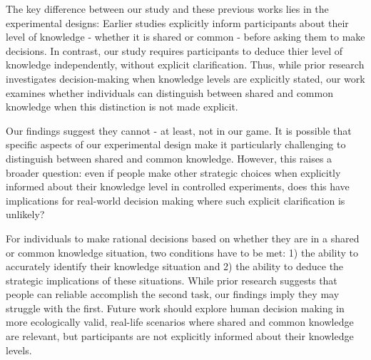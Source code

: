 \documentclass[twocolumn,a4paper,superscriptaddress,nofootinbib]{revtex4}
\begin{document}
The key difference between our study and these previous works lies in the experimental designs: Earlier studies explicitly inform participants about their level of knowledge - whether it is shared or common - before asking them to make decisions. In contrast, our study requires participants to deduce thier level of knowledge independently, without explicit clarification. 
Thus, while prior research investigates %
decision-making when knowledge levels are explicitly stated, our work examines whether individuals can distinguish between shared and common knowledge when this distinction is not made explicit. 

Our findings suggest they cannot - at least, not in our game. It is possible that 
specific aspects of our %
experimental design make it particularly challenging to distinguish between shared and common knowledge. %
However, this raises a broader question: even if people make other strategic choices when explicitly informed about %
their knowledge level in controlled experiments, %
does this have implications for real-world decision making %
where such explicit clarification is unlikely?

For individuals to make rational decisions based on %
whether they are in a shared or common knowledge situation, %
two conditions have to be met: 1) the ability to accurately identify %
their knowledge situation %
and 2) the ability to deduce the strategic implications of these %
situations. 
While prior research suggests that %
people %
can reliable accomplish the %
second task, our findings imply they %
may struggle with the first. %
Future work %
should explore human decision making in more ecologically valid, real-life scenarios where shared and common knowledge are relevant, %
but %
participants are not explicitly informed about their knowledge levels.
\end{document}

